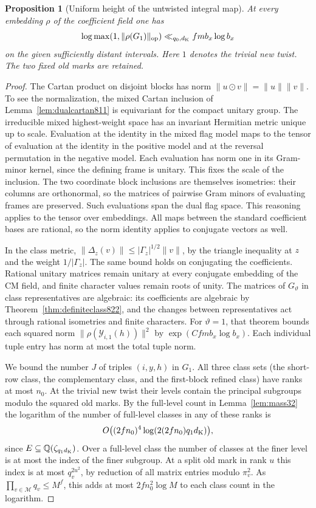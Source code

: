\documentclass[a4paper,11pt]{article}
\newtheorem{proposition}{Proposition}[section]
\theoremstyle{definition}
\theoremstyle{remark}
\numberwithin{equation}{section}
\begin{document}
\begin{proposition}[Uniform height of the untwisted integral map]
\leavevmode\label{prop:gluedheight845}
At every embedding \(\rho\) of the coefficient field one has
\[
  \log\max(1,\|\rho(G_1)\|_{\rm op})
       \ll_{q_0,d_{\rm K}} f m b_x\log b_x
\]
on the given sufficiently distant intervals. Here \(1\) denotes
the trivial new twist. The two fixed old marks are retained.
\end{proposition}
\begin{proof}
The Cartan product on disjoint blocks has norm
\(\|u\odot v\|=\|u\|\|v\|\). To see the normalization, the mixed
Cartan inclusion of Lemma~\ref{lem:dualcartan811} is equivariant
for the compact unitary group. The irreducible mixed highest-weight
space has an invariant Hermitian metric unique up to scale.
Evaluation at the identity in the mixed flag model maps to the
tensor of evaluation at the identity in the positive model and at
the reversal permutation in the negative model. Each evaluation has
norm one in its Gram-minor kernel, since the defining frame is
unitary. This fixes the scale of the inclusion. The two coordinate
block inclusions are themselves isometries: their columns are
orthonormal, so the matrices of pairwise Gram minors of evaluating
frames are preserved. Such evaluations span the dual flag space.
This reasoning applies to the tensor over embeddings. All maps
between the standard coefficient bases are rational, so the norm
identity applies to conjugate vectors as well.

In the class metric,
\(\|\Delta_z(v)\|\le|\Gamma_z|^{1/2}\|v\|\), by the triangle
inequality at \(z\) and the weight \(1/|\Gamma_z|\).
The same bound holds on conjugating the coefficients. Rational
unitary matrices remain unitary at every conjugate embedding of
the CM field, and finite character values remain roots of unity.
The matrices of \(G_\vartheta\) in class representatives are
algebraic: its coefficients are algebraic by
Theorem~\ref{thm:definiteclass822}, and the changes between
representatives act through rational isometries and finite
characters. For \(\vartheta=1\), that theorem bounds each squared
norm \(\|\rho(\mathcal Y_{i,1}(h))\|^2\) by
\(\exp(Cfmb_x\log b_x)\). Each individual tuple entry has norm
at most the total tuple norm.

We bound the number \(J\) of triples \((i,y,h)\) in
\(G_1\). All three class sets (the short-row class, the
complementary class, and the first-block refined class) have
ranks at most \(n_0\). At the trivial new twist their levels
contain the principal subgroups modulo the squared old marks.
By the full-level count in Lemma~\ref{lem:mass32} the logarithm
of the number of full-level classes in any of these ranks is
\[
       O\bigl((2fn_0)^4\log(2(2fn_0)q_1d_{\rm K})\bigr),
\]
since \(E\subseteq\mathbb Q(\zeta_{q_1d_{\rm K}})\). Over a
full-level class the number of classes at the finer level is at
most the index of the finer subgroup. At a split old mark in
rank \(u\) this index is at most \(q_v^{2u^2}\), by reduction
of all matrix entries modulo \(\pi_v^2\). As
\(\prod_{v\in\mathcal M}q_v\le M^f\), this adds at most
\(2f n_0^2\log M\) to each class count in the logarithm.


\end{proof}
\end{document}
